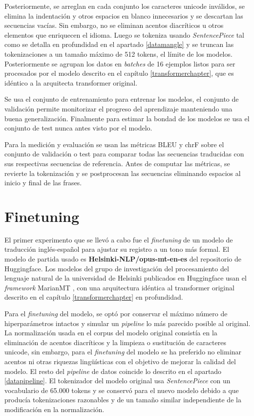 Posteriormente, se arreglan en cada conjunto los caracteres unicode inválidos, se elimina la indentación y otros espacios en blanco innecesarios y se descartan las secuencias vacías. Sin embargo, no se eliminan acentos diacríticos u otros elementos que enriquecen el idioma. Luego se tokeniza usando \textit{SentencePiece} tal como se detalla en profundidad en el apartado \ref{datamangle} y se truncan las tokenizaciones a un tamaño máximo de 512 tokens, el límite de los modelos. Posteriormente se agrupan los datos en \textit{batches} de 16 ejemplos listos para ser procesados por el modelo descrito en el capítulo \ref{transformerchapter}, que es idéntico a la arquitecta transformer original.

Se usa el conjunto de entrenamiento para entrenar los modelos, el conjunto de validación permite monitorizar el progreso del aprendizaje manteniendo una buena generalización. Finalmente para estimar la bondad de los modelos se usa el conjunto de test nunca antes visto por el modelo.

Para la medición y evaluación se usan las métricas BLEU y chrF sobre el conjunto de validación o test para comparar todas las secuencias traducidas con sus respectivas secuencias de referencia. Antes de computar las métricas, se revierte la tokenización y se postprocesan las secuencias eliminando espacios al inicio y final de las frases.

\section{Finetuning}\label{finetune}
El primer experimento que se llevó a cabo fue el \textit{finetuning} de un modelo de traducción inglés-español para ajustar su registro a un tono más formal.
El modelo de partida usado es \textbf{Helsinki-NLP/opus-mt-en-es} del repositorio de Huggingface.
Los modelos del grupo de investigación del procesamiento del lenguaje natural de la universidad de Helsinki publicados en Huggingface usan el \textit{framework} MarianMT \cite{Junczys-Dowmunt2018Apr}, con una arquitectura idéntica al transformer original descrito en el capítulo \ref{transformerchapter} en profundidad.

Para el \textit{finetuning} del modelo, se optó por conservar el máximo número de hiperparámetros intactos y simular un \textit{pipeline} lo más parecido posible al original.
La normalización usada en el corpus del modelo original consistía en la eliminación de acentos diacríticos y la limpieza o sustitución de caracteres unicode, sin embargo, para el \textit{finetuning} del modelo se ha preferido no eliminar acentos ni otras riquezas ling{\"u}ísticas con el objetivo de mejorar la calidad del modelo. El resto del \textit{pipeline} de datos coincide lo descrito en el apartado \ref{datapipeline}.
El tokenizador del modelo original usa \textit{SentencePiece} con un vocabulario de 65.000 tokens y se conservó para el nuevo modelo debido a que producía tokenizaciones razonables y de un tamaño similar independiente de la modificación en la normalización.

